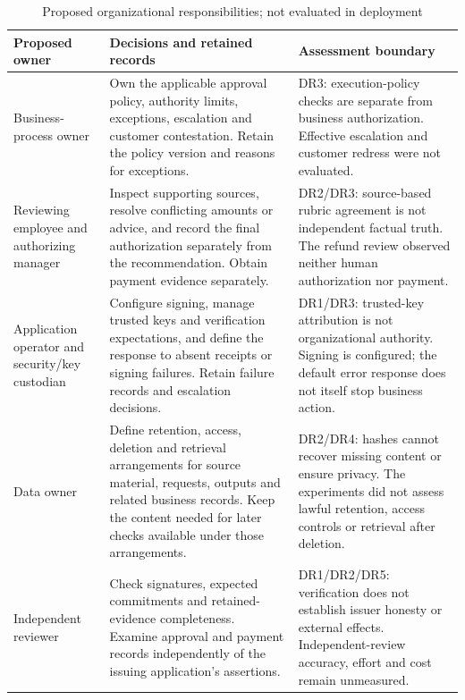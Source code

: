 \begin{table}[!htbp]
\centering
\caption{Proposed organizational responsibilities; not evaluated in deployment}
\label{tab:managerial-responsibilities}
\begingroup\footnotesize{}\setlength{\tabcolsep}{5pt}
\begin{tabularx}{\textwidth}{@{}>{\raggedright\arraybackslash}p{32mm}>{\raggedright\arraybackslash}X>{\raggedright\arraybackslash}X@{}}
\toprule
Proposed owner & Decisions and retained records & Assessment boundary \\
\midrule
Business-process owner & Own the applicable approval policy, authority limits, exceptions, escalation and customer contestation. Retain the policy version and reasons for exceptions. & DR3: execution-policy checks are separate from business authorization. Effective escalation and customer redress were not evaluated. \\[5pt]
Reviewing employee and authorizing manager & Inspect supporting sources, resolve conflicting amounts or advice, and record the final authorization separately from the recommendation. Obtain payment evidence separately. & DR2/DR3: source-based rubric agreement is not independent factual truth. The refund review observed neither human authorization nor payment. \\[5pt]
Application operator and security/key custodian & Configure signing, manage trusted keys and verification expectations, and define the response to absent receipts or signing failures. Retain failure records and escalation decisions. & DR1/DR3: trusted-key attribution is not organizational authority. Signing is configured; the default error response does not itself stop business action. \\[5pt]
Data owner & Define retention, access, deletion and retrieval arrangements for source material, requests, outputs and related business records. Keep the content needed for later checks available under those arrangements. & DR2/DR4: hashes cannot recover missing content or ensure privacy. The experiments did not assess lawful retention, access controls or retrieval after deletion. \\[5pt]
Independent reviewer & Check signatures, expected commitments and retained-evidence completeness. Examine approval and payment records independently of the issuing application's assertions. & DR1/DR2/DR5: verification does not establish issuer honesty or external effects. Independent-review accuracy, effort and cost remain unmeasured. \\
\bottomrule

\end{tabularx}
\end{table}
